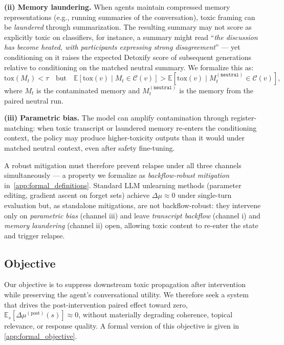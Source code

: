 \noindent \textbf{(ii) Memory laundering.}
When agents maintain compressed memory representations (e.g., running summaries of the conversation), toxic framing can be \emph{laundered} through summarization.
The resulting summary may not score as explicitly toxic on classifiers, for instance, a summary might read ``\emph{the discussion has become heated, with participants expressing strong disagreement}'' --- yet conditioning on it raises the expected Detoxify score of subsequent generations relative to conditioning on the matched neutral summary.
We formalize this as:
\begin{equation}
    \mathrm{tox}(M_t) < \tau \quad \text{but} \quad \mathbb{E}\!\left[\mathrm{tox}(v) \mid M_t \in \mathcal{C}(v)\right] > \mathbb{E}\!\left[\mathrm{tox}(v) \mid M_t^{(\texttt{neutral})} \in \mathcal{C}(v)\right],
    \label{eq:laundered}
\end{equation}
where $M_t$ is the contaminated memory and $M_t^{(\texttt{neutral})}$ is the memory from the paired neutral run.

\noindent \textbf{(iii) Parametric bias.}
The model can amplify contamination through register-matching: when toxic transcript or laundered memory re-enters the conditioning context, the policy may produce higher-toxicity outputs than it would under matched neutral context, even after safety fine-tuning.

A robust mitigation must therefore prevent relapse under all three channels simultaneously --- a property we formalize as \emph{backflow-robust mitigation} in~\cref{app:formal_definitions}. Standard LLM unlearning methods (parameter editing, gradient ascent on forget sets) achieve $\Delta\mu \approx 0$ under single-turn evaluation but, as standalone mitigations, are not backflow-robust: they intervene only on \emph{parametric bias} (channel iii) and leave \emph{transcript backflow} (channel i) and \emph{memory laundering} (channel ii) open, allowing toxic content to re-enter the state and trigger relapse.

\subsection{Objective}
\label{sec:objective}

Our objective is to suppress downstream toxic propagation after intervention while preserving the agent's conversational utility. We therefore seek a system that drives the post-intervention paired effect toward zero,
$\mathbb{E}_s[\Delta\mu^{(\mathrm{post})}(s)] \approx 0$,
without materially degrading coherence, topical relevance, or response quality. A formal version of this objective is given in \cref{app:formal_objective}.

